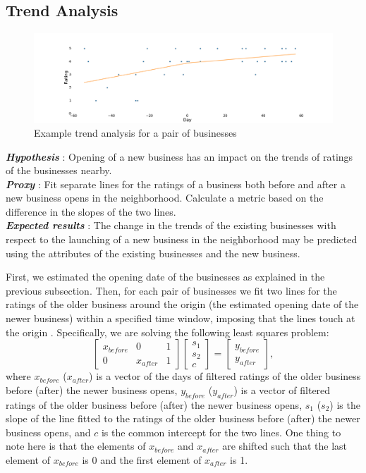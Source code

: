 \documentclass{vldb}
\begin{document}
\subsection*{Trend Analysis}
\begin{figure}[h]
\centering
\includegraphics[width=\columnwidth]{trend.pdf}
\caption{Example trend analysis for a pair of businesses}
\end{figure}

\textbf{\textit{Hypothesis}} : Opening of a new business has an impact on the trends of ratings of the businesses nearby.\\
\textbf{\textit{Proxy}} : Fit separate lines for the ratings of a business both before and after a new business opens in the neighborhood. Calculate a metric based on the difference in the slopes of the two lines.\\
\textbf{\textit{Expected results}} : The change in the trends of the existing businesses with respect to the launching  of a new business in the neighborhood may be predicted using the attributes of the existing businesses and the new business. 

First, we estimated the opening date of the businesses as explained in the previous subsection. Then, for each pair of businesses we fit two lines for the ratings of the older business around the origin (the estimated opening date of the newer business) within a specified time window, imposing that the lines touch at the origin . Specifically, we are solving the following least squares problem:
\begin{equation*}
 \left [\begin{array}{ccc}x_{before} & 0 & 1 \\
 0 & x_{after} & 1 \end{array} \right ] 
  \left [\begin{array}{c}s_1 \\ s_2 \\ c \end{array} \right ] 
 =  \left [\begin{array}{c}y_{before} \\ y_{after} \end{array} \right ] ,
\end{equation*}
where $x_{before}$  ($x_{after}$) is a vector of the days of filtered ratings of the older business before (after) the newer business opens, $y_{before}$  ($y_{after}$) is a vector of filtered ratings of the older business before  (after) the newer business opens, $s_1$  ($s_2$) is the slope of the line fitted to the ratings of the older business before  (after) the newer business opens, and $c$ is the common intercept for the two lines. One thing to note here is that the elements of $x_{before}$ and $x_{after}$ are shifted such that the last element of $x_{before}$ is 0 and the first element of $x_{after}$ is 1.
\end{document}
